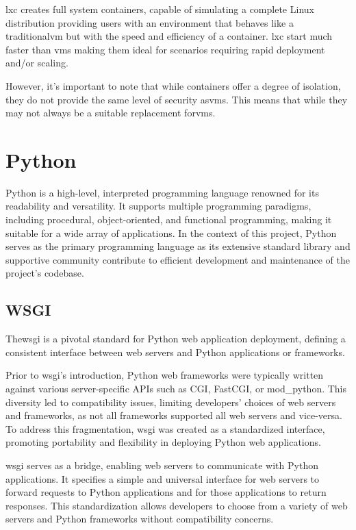 \ac{lxc} creates full system containers, capable of simulating a complete Linux distribution providing users with an 
environment that behaves like a traditional\ac{vm} but with the speed and efficiency of a container. \ac{lxc} start 
much faster than \ac{vm}s making them ideal for scenarios requiring rapid deployment and/or scaling.

However, it's important to note that while containers offer a degree of isolation, they do not provide the same level of
security as\ac{vm}s. This means that while they may not always be a suitable replacement for\ac{vm}s.

\section{Python}
Python is a high-level, interpreted programming language renowned for its readability and versatility. It supports 
multiple programming paradigms, including procedural, object-oriented, and functional programming, making it suitable 
for a wide array of applications.
In the context of this project, Python serves as the primary programming language as its extensive standard library 
and supportive community contribute to efficient development and maintenance of the project's codebase.

\subsection{WSGI}
The\ac{wsgi} is a pivotal standard for Python web application deployment, defining a consistent interface between web 
servers and Python applications or frameworks.

Prior to \ac{wsgi}'s introduction, Python web frameworks were typically written against various server-specific APIs such as 
CGI, FastCGI, or mod\_python. This diversity led to compatibility issues, limiting developers' choices of web servers and 
frameworks, as not all frameworks supported all web servers and vice-versa. To address this fragmentation, \ac{wsgi} was 
created as a standardized interface, promoting portability and flexibility in deploying Python web applications. 

\ac{wsgi} serves as a bridge, enabling web servers to communicate with Python applications. It specifies a simple and universal 
interface for web servers to forward requests to Python applications and for those applications to return responses. 
This standardization allows developers to choose from a variety of web servers and Python frameworks without compatibility 
concerns\cite{pep333}.

